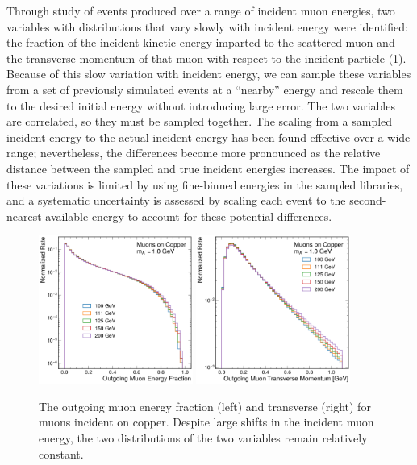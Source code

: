 Through study of \mg events produced over a range of incident muon energies, two variables with distributions that vary slowly with incident energy were identified: the fraction of the incident kinetic energy imparted to the scattered muon and the transverse momentum of that muon with respect to the incident particle (\cref{fig:efrac_pt}). 
Because of this slow variation with incident energy, we can sample these variables from a set of previously simulated \mg events at a ``nearby'' energy and rescale them to the desired initial energy without introducing large error. 
The two variables are correlated, so they must be sampled together. 
The scaling from a sampled \mg incident energy to the actual \gf incident energy has been found effective over a wide range; nevertheless, the differences become more pronounced as the relative distance between the sampled and true incident energies increases.
The impact of these variations is limited by using fine-binned energies in the sampled \mg libraries, and a systematic uncertainty is assessed by scaling each event to the second-nearest available energy to account for these potential differences. 

\begin{figure}[!htbp]
    \centering
    \includegraphics[width=0.45\textwidth]{figures/muon_energy_comp_efrac.pdf}
    \hspace{0.01\textwidth}
    \includegraphics[width=0.45\textwidth]{figures/muon_energy_comp_pt.pdf}
    \caption[
        Sampling variables used for \dbrem simulation.
    ]{
        The outgoing muon energy fraction (left) and transverse (right) for muons incident on copper. Despite large shifts in the incident muon energy, the two distributions of the two variables remain relatively constant. 
    }
    \label{fig:efrac_pt}
\end{figure}

